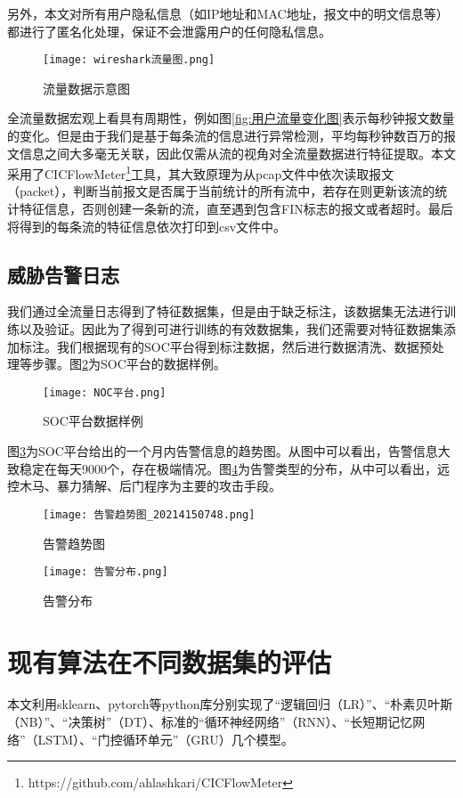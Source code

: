 另外，本文对所有用户隐私信息（如IP地址和MAC地址，报文中的明文信息等）都进行了匿名化处理，保证不会泄露用户的任何隐私信息。

\begin{figure}
    \centering
    \texttt{[image: wireshark流量图.png]}
    \caption{流量数据示意图}
    \label{fig:wireshark}
  \end{figure}

全流量数据宏观上看具有周期性，例如图\ref{fig:用户流量变化图}表示每秒钟报文数量的变化。但是由于我们是基于每条流的信息进行异常检测，平均每秒钟数百万的报文信息之间大多毫无关联，因此仅需从流的视角对全流量数据进行特征提取。本文采用了CICFlowMeter\footnote{https://github.com/ahlashkari/CICFlowMeter}工具，其大致原理为从pcap文件中依次读取报文（packet），判断当前报文是否属于当前统计的所有流中，若存在则更新该流的统计特征信息，否则创建一条新的流，直至遇到包含FIN标志的报文或者超时。最后将得到的每条流的特征信息依次打印到csv文件中。


\subsection{威胁告警日志}
我们通过全流量日志得到了特征数据集，但是由于缺乏标注，该数据集无法进行训练以及验证。因此为了得到可进行训练的有效数据集，我们还需要对特征数据集添加标注。我们根据现有的SOC平台得到标注数据，然后进行数据清洗、数据预处理等步骤。图\ref{fig:NOC平台数据样例}为SOC平台的数据样例。
\begin{figure}
    \centering
    \texttt{[image: NOC平台.png]}
    \caption{SOC平台数据样例}
    \label{fig:NOC平台数据样例}
  \end{figure}


图\ref{fig:告警趋势图}为SOC平台给出的一个月内告警信息的趋势图。从图中可以看出，告警信息大致稳定在每天9000个，存在极端情况。图\ref{fig:告警分布}为告警类型的分布，从中可以看出，远控木马、暴力猜解、后门程序为主要的攻击手段。
\begin{figure}
    \centering
    \texttt{[image: 告警趋势图\_20214150748.png]}
    \caption{告警趋势图}
    \label{fig:告警趋势图}
  \end{figure}
  \begin{figure}
    \centering
    \texttt{[image: 告警分布.png]}
    \caption{告警分布}
    \label{fig:告警分布}
  \end{figure}


\section{现有算法在不同数据集的评估}
本文利用sklearn、pytorch等python库分别实现了“逻辑回归（LR）”、“朴素贝叶斯（NB）”、“决策树”（DT）、标准的“循环神经网络”（RNN）、“长短期记忆网络”（LSTM）、“门控循环单元”（GRU）几个模型。

